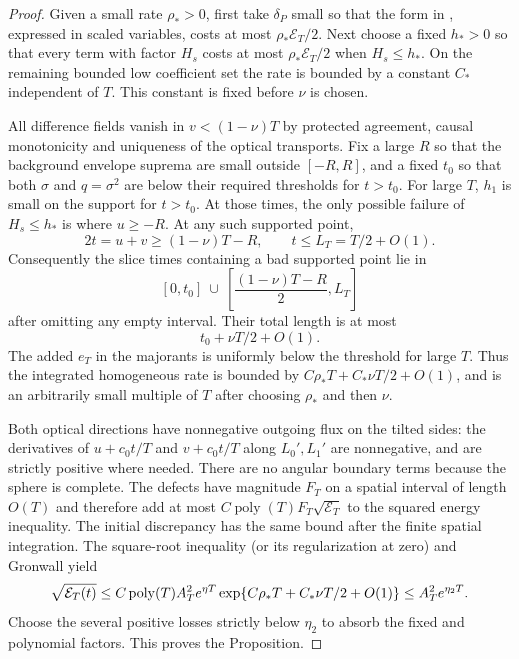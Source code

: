 \begin{proof}
Given a small rate $\rho_*>0$, first take $\delta_P$ small so
that the form in , expressed in scaled
variables, costs at most $\rho_*\mathcal E_T/2$.
Next choose a fixed $h_*>0$ so that every term with factor $H_s$
costs at most $\rho_*\mathcal E_T/2$ when $H_s\le h_*$.
On the remaining bounded low coefficient set the rate is bounded
by a constant $C_*$ independent of $T$.  This constant is fixed
before $\nu$ is chosen.

All difference fields vanish in $v<(1-\nu)T$ by protected
agreement, causal monotonicity and uniqueness of the optical
transports.  Fix a large $R$ so that the background envelope
suprema are small outside $[-R,R]$, and a fixed $t_0$ so that both
$\sigma$ and $q=\sigma^2$ are below their required thresholds for
$t>t_0$.  For large $T$, $h_1$ is small on the support for $t>t_0$.
At those times, the only possible
failure of $H_s\le h_*$ is where $u\ge-R$.  At any such supported
point,
\[
 2t=u+v\ge (1-\nu)T-R,
 \qquad t\le L_T=T/2+O(1).
\]
Consequently the slice times containing a bad supported point lie in
\[
 [0,t_0]\ \cup\
 \left[\frac{(1-\nu)T-R}{2},L_T\right]
\]
after omitting any empty interval.  Their total length is at most
\begin{equation}\label{dn:bad-strip}
                 t_0+\nu T/2+O(1).
\end{equation}
The added $e_T$ in the majorants is uniformly below the threshold
for large $T$.  Thus the integrated homogeneous rate is bounded by
$C\rho_*T+C_*\nu T/2+O(1)$, and is an arbitrarily small multiple
of $T$ after choosing $\rho_*$ and then $\nu$.

Both optical directions have nonnegative outgoing flux on the
tilted sides: the derivatives of $u+c_0t/T$ and $v+c_0t/T$ along
$L_0',L_1'$ are nonnegative, and are strictly positive where
needed.  There are no angular boundary terms because the sphere
is complete.  The defects have magnitude $F_T$ on a spatial
interval of length $O(T)$ and therefore add at most
$C\operatorname{poly}(T)F_T\sqrt{\mathcal E_T}$ to the squared
energy inequality.  The initial discrepancy has the same bound
after the finite spatial integration.  The square-root inequality
(or its regularization at zero) and Gronwall yield
\begin{equation}\label{dn:quadratic-energy}
 \sqrt{\mathcal E_T(t)}\le
 C\operatorname{poly}(T)A_T^2e^{\eta T}
 \exp\{C\rho_*T+C_*\nu T/2+O(1)\}
                     \le A_T^2e^{\eta_2T}.
\end{equation}
Choose the several positive losses strictly below $\eta_2$ to
absorb the fixed and polynomial factors.  This proves the Proposition.
\end{proof}

